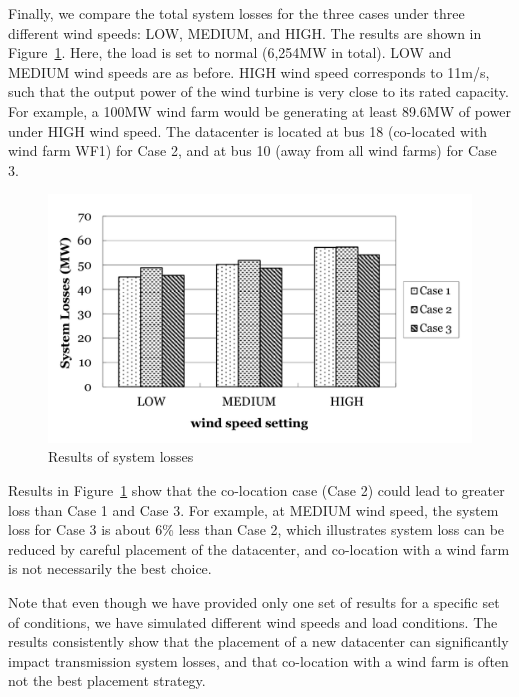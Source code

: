 Finally, we compare the total system losses for the three cases under
three different wind speeds: LOW, MEDIUM, and HIGH.  The results are
shown in Figure~\ref{fig:loss-cases}.  Here, the load is set to normal
(6,254MW in total).  LOW and MEDIUM wind speeds are as before.  HIGH
wind speed corresponds to 11m/s, such that the output power of the
wind turbine is very close to its rated capacity. For example, a 100MW
wind farm would be generating at least 89.6MW of power under HIGH wind
speed.  The datacenter is located at bus 18 (co-located with wind farm
WF1) for Case 2, and at bus 10 (away from all wind farms) for Case 3.

\begin{figure}[hb]
\centering
\includegraphics[width=1\columnwidth]{img/loss3cases.pdf}
\caption{Results of system losses}%
\label{fig:loss-cases}
\end{figure}

Results in Figure~\ref{fig:loss-cases} show that the co-location case
(Case 2) could lead to greater loss than Case 1 and Case 3. For
example, at MEDIUM wind speed, the system loss for Case 3 is about 6\%
less than Case 2, which illustrates system loss can be reduced by
careful placement of the datacenter, and co-location with a wind farm
is not necessarily the best choice.

Note that even though we have provided only one set of results for a
specific set of conditions, we have simulated different wind speeds and
load conditions.  The results consistently show that the placement of
a new datacenter can significantly impact transmission system losses,
and that co-location with a wind farm is often not the best placement
strategy.


